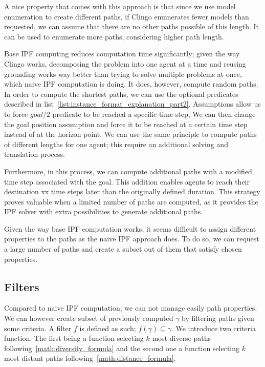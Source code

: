 A nice property that comes with this approach is that since we use model enumeration to create different paths, if Clingo enumerates fewer models than requested, we can assume that there are no other paths possible of this length. It can be used to enumerate more paths, considering higher path length.

Base IPF computing reduces computation time significantly; given the way Clingo works, decomposing the problem into one agent at a time and reusing grounding works way better than trying to solve multiple problems at once, which naive IPF computation is doing. It does, however, compute random paths. In order to compute the shortest paths, we can use the optional predicates described in list~\ref{list:instance_format_explanation_part2}. Assumptions allow us to force \(goal/2\) predicate to be reached a specific time step,  We can then change the goal position assumption and force it to be reached at a certain time step instead of at the horizon point. We can use the same principle to compute paths of different lengths for one agent; this require an additional solving and translation process.

Furthermore, in this process, we can compute additional paths with a modified time step associated with the goal. This addition enables agents to reach their destination xx time steps later than the originally defined duration. This strategy proves valuable when a limited number of paths are computed, as it provides the IPF solver with extra possibilities to generate additional paths.

Given the way base IPF computation works, it seems difficult to assign different properties to the paths as the naive IPF approach does. To do so, we can request a large number of paths and create a subset out of them that satisfy chosen properties. 






\subsection{Filters}

Compared to naive IPF computation, we can not manage easily path properties. We can however create subset of previously computed \(\gamma\) by filtering paths given some criteria. A filter \(f\) is defined as such; \( f(\gamma) \subseteq \gamma \). We introduce two criteria function. The first being a function selecting \(k\) most diverse paths following~\ref{math:diversity_formula} and the second one a function selecting \(k\) most distant paths following~\ref{math:distance_formula}.

